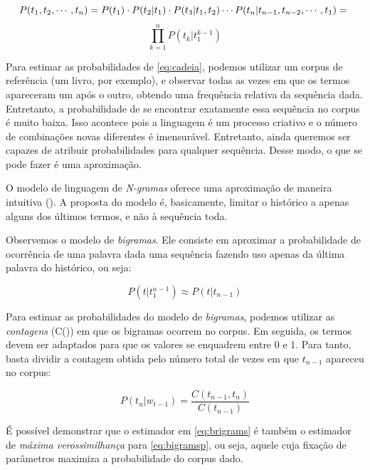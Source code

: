 \begin{equation}
\label{eq:cadeia}
	P(t_1, t_2, \cdots, t_n) = P(t_1)\cdot P(t_2|t_1)\cdot P(t_3|t_1, t_2) \cdots P(t_n|t_{n-1},t_{n-2}, \cdots, t_1) =\notag\\ 
\end{equation}
\begin{equation}
	\prod_{k=1}^{n} P(t_{k}|t_{1}^{k-1})
\end{equation}

Para estimar as probabilidades de \ref{eq:cadeia}, podemos utilizar um corpus de referência (um livro, por exemplo), e observar todas as vezes em que os termos apareceram um após o outro, obtendo uma frequência relativa da sequência dada. Entretanto, a probabilidade de se encontrar exatamente essa sequência no corpus é muito baixa. Isso acontece pois a linguagem é um processo criativo e o número de combinações novas diferentes é imensurável. Entretanto, ainda queremos ser capazes de atribuir probabilidades para qualquer sequência. Desse modo, o que se pode fazer é uma aproximação.

O modelo de linguagem de \textit{N-gramas} oferece uma aproximação de maneira intuitiva (\cite{Jurafsky:2009:SLP:1214993}). A proposta do modelo é, basicamente, limitar o histórico a apenas alguns dos últimos termos, e não à sequência toda. 

Observemos o modelo de \textit{bigramas}. Ele consiste em aproximar a probabilidade de ocorrência de uma palavra dada uma sequência
fazendo uso apenas da última palavra do histórico, ou seja:

\begin{equation}
\label{eq:bigramsp}
    P(t|t_{1}^{n-1}) \approx P(t|t_{n-1})
\end{equation}

Para estimar as probabilidades do modelo de \textit{bigramas}, podemos utilizar as \textit{contagens} (C()) em que os bigramas ocorrem no corpus. Em seguida, os termos devem ser adaptados para que os valores se enquadrem entre 0 e 1. Para tanto, basta dividir a contagem obtida pelo número total de vezes em que $t_{n-1}$ apareceu no corpus:

\begin{equation}
\label{eq:brigrams}
    P(t_n|w_{t-1}) = \frac{C(t_{n-1}, t_n)}{C(t_{n-1})}
\end{equation}


É possível demonstrar que o estimador em \ref{eq:brigrams} é também o estimador de \textit{máxima verossimilhança} para \ref{eq:bigramsp}, ou seja, aquele cuja fixação de parâmetros maximiza a probabilidade do corpus dado.

